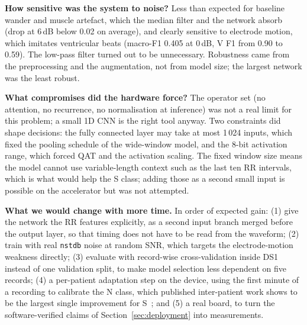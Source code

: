 \textbf{How sensitive was the system to noise?} Less than expected for baseline wander and muscle artefact, which the median filter and the network absorb (drop at 6\,dB below 0.02 on average), and clearly sensitive to electrode motion, which imitates ventricular beats (macro-F1 0.405 at 0\,dB, V F1 from 0.90 to 0.59). The low-pass filter turned out to be unnecessary. Robustness came from the preprocessing and the augmentation, not from model size; the largest network was the least robust.

\textbf{What compromises did the hardware force?} The operator set (no attention, no recurrence, no normalisation at inference) was not a real limit for this problem; a small 1D CNN is the right tool anyway. Two constraints did shape decisions: the fully connected layer may take at most 1\,024 inputs, which fixed the pooling schedule of the wide-window model, and the 8-bit activation range, which forced QAT and the activation scaling. The fixed window size means the model cannot use variable-length context such as the last ten RR intervals, which is what would help the S class; adding those as a second small input is possible on the accelerator but was not attempted.

\textbf{What we would change with more time.} In order of expected gain: (1) give the network the RR features explicitly, as a second input branch merged before the output layer, so that timing does not have to be read from the waveform; (2) train with real \texttt{nstdb} noise at random SNR, which targets the electrode-motion weakness directly; (3) evaluate with record-wise cross-validation inside DS1 instead of one validation split, to make model selection less dependent on five records; (4) a per-patient adaptation step on the device, using the first minute of a recording to calibrate the N class, which published inter-patient work shows to be the largest single improvement for S~\cite{dechazal2006adapting}; and (5) a real board, to turn the software-verified claims of Section~\ref{sec:deployment} into measurements.
